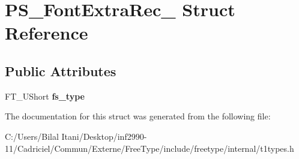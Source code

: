 \hypertarget{struct_p_s___font_extra_rec__}{}\section{P\+S\+\_\+\+Font\+Extra\+Rec\+\_\+ Struct Reference}
\label{struct_p_s___font_extra_rec__}
\subsection*{Public Attributes}
\begin{DoxyCompactItemize}
\item 
F\+T\+\_\+\+U\+Short {\bfseries fs\+\_\+type}\hypertarget{struct_p_s___font_extra_rec___a048e1e57ee974c3e05e9a88476e6b8a9}{}\label{struct_p_s___font_extra_rec___a048e1e57ee974c3e05e9a88476e6b8a9}

\end{DoxyCompactItemize}


The documentation for this struct was generated from the following file\+:\begin{DoxyCompactItemize}
\item 
C\+:/\+Users/\+Bilal Itani/\+Desktop/inf2990-\/11/\+Cadriciel/\+Commun/\+Externe/\+Free\+Type/include/freetype/internal/t1types.\+h\end{DoxyCompactItemize}
